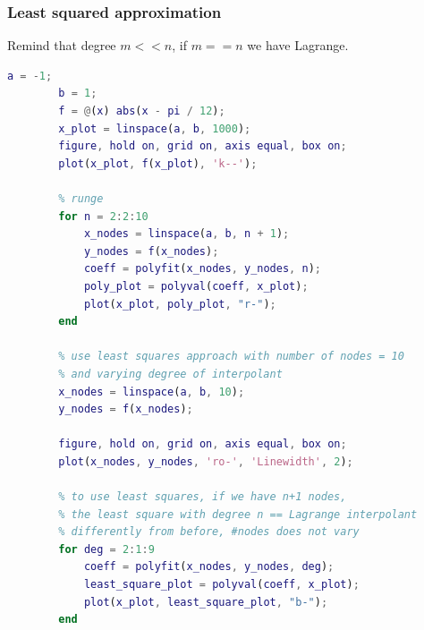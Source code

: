     \subsubsection{Least squared approximation}
        Remind that degree $m<<n$, if $m==n$ we have Lagrange.
        \begin{lstlisting}[language=Matlab, escapeinside=`', gobble=8]
        a = -1;
        b = 1;
        f = @(x) abs(x - pi / 12);
        x_plot = linspace(a, b, 1000);
        figure, hold on, grid on, axis equal, box on;
        plot(x_plot, f(x_plot), 'k--');

        % runge
        for n = 2:2:10
            x_nodes = linspace(a, b, n + 1);
            y_nodes = f(x_nodes);
            coeff = polyfit(x_nodes, y_nodes, n);
            poly_plot = polyval(coeff, x_plot);
            plot(x_plot, poly_plot, "r-");
        end

        % use least squares approach with number of nodes = 10
        % and varying degree of interpolant
        x_nodes = linspace(a, b, 10);
        y_nodes = f(x_nodes);

        figure, hold on, grid on, axis equal, box on;
        plot(x_nodes, y_nodes, 'ro-', 'Linewidth', 2);

        % to use least squares, if we have n+1 nodes,
        % the least square with degree n == Lagrange interpolant
        % differently from before, #nodes does not vary
        for deg = 2:1:9
            coeff = polyfit(x_nodes, y_nodes, deg);
            least_square_plot = polyval(coeff, x_plot);
            plot(x_plot, least_square_plot, "b-");
        end
        \end{lstlisting}
        
